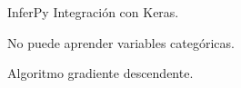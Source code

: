 \documentclass[aspectratio=169]{beamer}
\begin{document}
  \begin{frame}{InferPy}
    Integración con Keras.

    No puede aprender variables categóricas.

    Algoritmo gradiente descendente.
    \captionsetup[subfigure]{labelformat=empty}
     \begin{figure}[h]
       \centering
     \end{figure}
    \end{frame}
\end{document}
